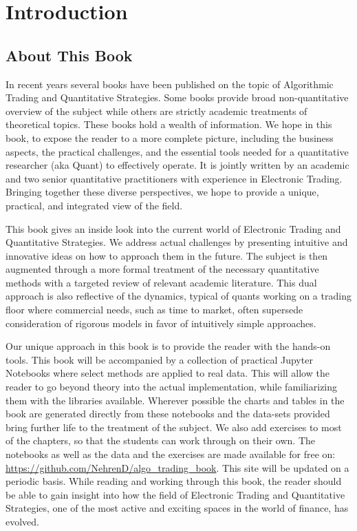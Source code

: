 \chapter{Introduction}\label{chap:ch_intro}
\section{About This Book}

In recent years several books have been published  on the topic of Algorithmic Trading and Quantitative Strategies. Some books provide broad non-quantitative overview of the subject while others are strictly academic treatments of theoretical topics. These books hold a wealth of  information. We hope in this book, to expose the reader to a more complete picture, including the business aspects, the practical challenges, and the essential tools needed for a quantitative researcher (aka Quant) to effectively operate. It is jointly written by an academic and two senior quantitative practitioners with experience in Electronic Trading. Bringing together these diverse perspectives, we hope to provide a unique, practical, and integrated view of the field.


This book gives an inside look into the current world of Electronic Trading and Quantitative Strategies. We address actual challenges by presenting intuitive and innovative ideas on how to approach them in the future. The subject is then augmented through a more formal treatment of the necessary quantitative methods with a targeted review of relevant academic literature. This dual approach is also reflective of the dynamics, typical of quants working on a trading floor where commercial needs, such as time to market, often supersede consideration of rigorous models in favor of intuitively simple approaches. 


Our unique approach in this book is to provide the reader with the hands-on tools. This book will be accompanied by a collection of practical Jupyter Notebooks where select methods are applied to real data. This will allow the reader to go beyond theory into the actual implementation, while familiarizing them with the libraries available. Wherever possible the charts and tables in the book are generated directly from these notebooks and the data-sets provided bring further life to the treatment of the subject. We also add exercises to most of the chapters, so that the students can work through on their own. The notebooks as well as the data and the exercises are made  available for free on: \url{https://github.com/NehrenD/algo_trading_book}. This site will be updated on a periodic basis. While reading and working through this book, the reader should be able to gain insight into how the field of Electronic Trading and Quantitative Strategies, one of the most active and exciting spaces in the world of finance, has evolved.



